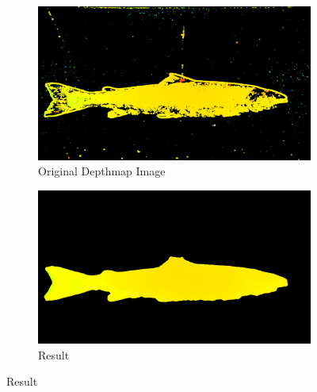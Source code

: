 \begin{figure}[H]
    \centering
    \begin{subfigure}{0.49\textwidth}
        \includegraphics[width=\linewidth]{images/results/algorithm_test/original_63}
        \caption{Original Depthmap Image} 
        \label{fig:original_depthmap_63}
    \end{subfigure}\hspace*{\fill}
    \begin{subfigure}{0.49\textwidth}
        \includegraphics[width=\linewidth]{images/results/algorithm_test/median_filter_63}
        \caption{Result} 
        \label{fig:result_63}
    \end{subfigure}
    

\end{figure}
